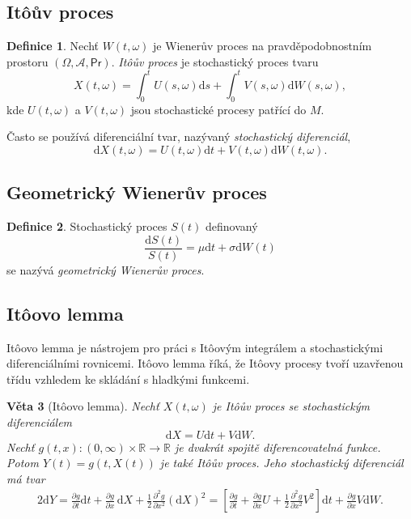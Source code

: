 \documentclass[a4paper,12pt]{report}
\newtheorem{veta}{Věta}
\theoremstyle{definition} \newtheorem{definice}[veta]{Definice}
\theoremstyle{remark}
\begin{document}
\subsection{It\^oův proces}

\begin{definice}
Nechť $W(t,\omega)$ je Wienerův proces na pravděpodobnostním prostoru $(\Omega,\mathcal{A},\mathsf{Pr})$.
\textit{It\^oův proces} je stochastický proces tvaru
$$X(t,\omega)=\int_0^tU(s,\omega)\mathrm{d}s+\int_0^tV(s,\omega)\mathrm{d}W(s,\omega),$$
kde $U(t,\omega)$ a $V(t,\omega)$ jsou stochastické procesy patřící do $M$.

Často se používá diferenciální tvar, nazývaný \textit{stochastický diferenciál},
$$\mathrm{d}X(t,\omega)=U(t,\omega)\mathrm{d}t+V(t,\omega)\mathrm{d}W(t,\omega).$$
\end{definice}


\subsection{Geometrický Wienerův proces}
\begin{definice}
Stochastický proces $S(t)$ definovaný 
$$\frac{\mathrm{d} S(t)}{S(t)} = \mu\mathrm{d}t + \sigma\mathrm{d}W (t)$$
se nazývá \textit{geometrický Wienerův proces}.
\end{definice}

\subsection{It\^oovo lemma}
It\^oovo lemma je nástrojem pro práci s It\^oovým integrálem a stochastickými diferenciálními rovnicemi.
It\^oovo lemma říká, že It\^oovy procesy tvoří uzav\-ře\-nou třídu vzhledem ke skládání s hladkými funkcemi.

\begin{veta}[It\^oovo lemma]
Nechť $X(t,\omega)$ je It\^oův proces se stochastickým diferenciálem
$$\mathrm{d}X=U\mathrm{d}t+V\mathrm{d}W.$$
Nechť $g(t,x):(0,\infty)\times\mathbb R\to\mathbb R$ je dvakrát spojitě diferencovatelná funkce.
Potom $Y(t)=g(t,X(t))$ je také It\^oův proces.
Jeho stochastický diferenciál má tvar
\begin{alignat*}{2}
\mathrm{d}Y=\frac{\partial g}{\partial t}\mathrm{d}t+\frac{\partial g}{\partial x}\,\mathrm{d}X+\frac12\frac{\partial^2 g}{\partial x^2}(\mathrm{d}X)^2=\left[\frac{\partial g}{\partial t}+\frac{\partial g}{\partial x}U+\frac12\frac{\partial^2 g}{\partial x^2}V^2\right]\mathrm{d}t+\frac{\partial g}{\partial x}V\mathrm{d}W.
\end{alignat*}
\end{veta}
\end{document}
